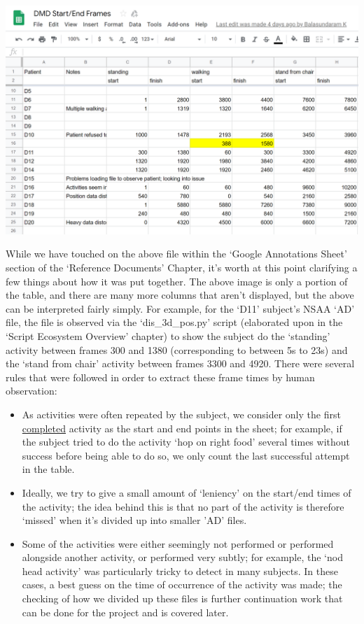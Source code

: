 \documentclass[12pt,twoside]{report}
\begin{document}
\begin{center}
\includegraphics[scale=0.25]{project_figures/fig8_9}
\end{center}

\quad While we have touched on the above file within the ‘Google Annotations Sheet’ section of the ‘Reference Documents’ Chapter, it’s worth at this point clarifying a few things about how it was put together. The above image is only a portion of the table, and there are many more columns that aren’t displayed, but the above can be interpreted fairly simply. For example, for the ‘D11’ subject’s NSAA ‘AD’ file, the file is observed via the ‘dis\_3d\_pos.py’ script (elaborated upon in the ‘Script Ecosystem Overview’ chapter) to show the subject do the ‘standing’ activity between frames 300 and 1380 (corresponding to between 5s to 23s) and the ‘stand from chair’ activity between frames 3300 and 4920. There were several rules that were followed in order to extract these frame times by human observation:

\begin{itemize}
	\item As activities were often repeated by the subject, we consider only the first \underline{completed} activity as the start and end points in the sheet; for example, if the subject tried to do the activity ‘hop on right food’ several times without success before being able to do so, we only count the last successful attempt in the table.
	\item Ideally, we try to give a small amount of ‘leniency’ on the start/end times of the activity; the idea behind this is that no part of the activity is therefore ‘missed’ when it’s divided up into smaller 'AD' files.
	\item Some of the activities were either seemingly not performed or performed alongside another activity, or performed very subtly; for example, the ‘nod head activity’ was particularly tricky to detect in many subjects. In these cases, a best guess on the time of occurrence of the activity was made; the checking of how we divided up these files is further continuation work that can be done for the project and is covered later.
\end{itemize}
\end{document}
